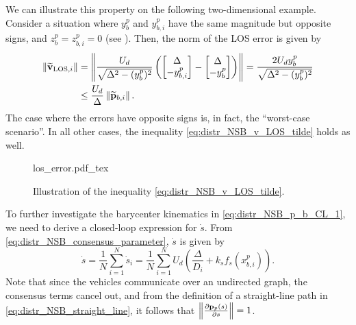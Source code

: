 We can illustrate this property on the following two-dimensional example.
Consider a situation where $y_b^p$ and $y_{b,i}^p$ have the same magnitude but opposite signs, and $z_b^p = z_{b,i}^p = 0$ (see ).
Then, the norm of the LOS error is given by
\begin{equation}
    \begin{split}
        \left\|\widetilde{\mathbf{v}}_{{\rm LOS}, i}\right\| &= \left\|\frac{U_d}{\sqrt{\Delta^2 - (y_b^p)^2}}\left(\begin{bmatrix} \Delta \\ -y_{b,i}^p \end{bmatrix} - \begin{bmatrix} \Delta \\ -y_b^p \end{bmatrix}\right)\right\| = \frac{2 U_d y_b^p}{\sqrt{\Delta^2 - (y_b^p)^2}} \\
        &\leq \frac{U_d}{\Delta} \left\|\widetilde{\mathbf{p}}_{b, i}\right\|.
    \end{split}
\end{equation}
The case where the errors have opposite signs is, in fact, the ``worst-case scenario''.
In all other cases, the inequality \eqref{eq:distr_NSB_v_LOS_tilde} holds as well.

\begin{figure}[tb]
    \centering
    \def\svgwidth{0.45\textwidth}
    {los_error.pdf_tex}
    \caption{Illustration of the inequality \eqref{eq:distr_NSB_v_LOS_tilde}.}
    \label{fig:distr_NSB_los_error}
\end{figure}

To further investigate the barycenter kinematics in \eqref{eq:distr_NSB_p_b_CL_1}, we need to derive a closed-loop expression for $\dot{s}$.
From \eqref{eq:distr_NSB_consensus_parameter}, $\dot{s}$ is given by
\begin{equation}
    \dot{s} = \frac{1}{N} \sum_{i=1}^N \dot{s}_i = \frac{1}{N} \sum_{i=1}^N U_{d\!} \left(\!\frac{\Delta}{D_i} + k_s f_{s}\!\left(\!x_{b, i\!}^p\right)\!\right).
    \label{eq:distr_NSB_s_dot_CL_1}
\end{equation}
Note that since the vehicles communicate over an undirected graph, the consensus terms cancel out, and from the definition of a straight-line path in \eqref{eq:distr_NSB_straight_line}, it follows that $\left\|\frac{\partial \mathbf{p}_p(s)}{\partial s}\right\| = 1$.


